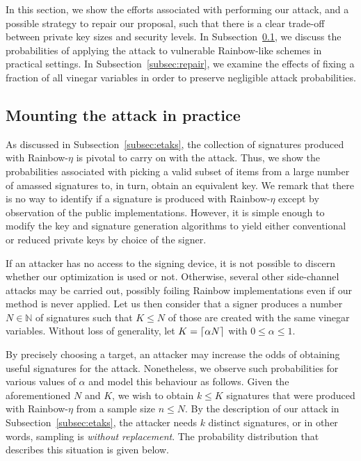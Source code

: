 \documentclass[12pt, a4paper, oneside]{memoir}
\DeclarePairedDelimiter{\ceil}{\lceil}{\rceil}
\theoremstyle{definition}
\begin{document}
In this section, we show the efforts associated with performing our attack, and a possible strategy to repair our proposal, such that there is a clear trade-off between private key sizes and security levels. In Subsection~\ref{subsec:mount}, we discuss the probabilities of applying the attack to vulnerable Rainbow-like schemes in practical settings. In Subsection~\ref{subsec:repair}, we examine the effects of fixing a fraction of all vinegar variables in order to preserve negligible attack probabilities.

\subsection{Mounting the attack in practice}\label{subsec:mount}

As discussed in Subsection~\ref{subsec:etaks}, the collection of signatures produced with Rainbow-$\eta$ is pivotal to carry on with the attack. Thus, we show the probabilities associated with picking a valid subset of items from a large number of amassed signatures to, in turn, obtain an equivalent key. We remark that there is no way to identify if a signature is produced with Rainbow-$\eta$ except by observation of the public implementations. However, it is simple enough to modify the key and signature generation algorithms to yield either conventional or reduced private keys by choice of the signer. 

If an attacker has no access to the signing device, it is not possible to discern whether our optimization is used or not. Otherwise, several other side-channel attacks may be carried out, possibly foiling Rainbow implementations even if our method is never applied. Let us then consider that a signer produces a number $N \in \mathbb{N}$ of signatures such that $K \leq N$ of those are created with the same vinegar variables. Without loss of generality, let $K = \ceil{\alpha N}$ with $0 \leq \alpha \leq 1$.

By precisely choosing a target, an attacker may increase the odds of obtaining useful signatures for the attack. Nonetheless, we observe such probabilities for various values of $\alpha$ and model this behaviour as follows. Given the aforementioned $N$ and $K$, we wish to obtain $k \leq K$ signatures that were produced with Rainbow-$\eta$ from a sample size $n \leq N$. By the description of our attack in Subsection~\ref{subsec:etaks}, the attacker needs $k$ distinct signatures, or in other words, sampling is \emph{without replacement}. The probability distribution that describes this situation is given below.
\end{document}
